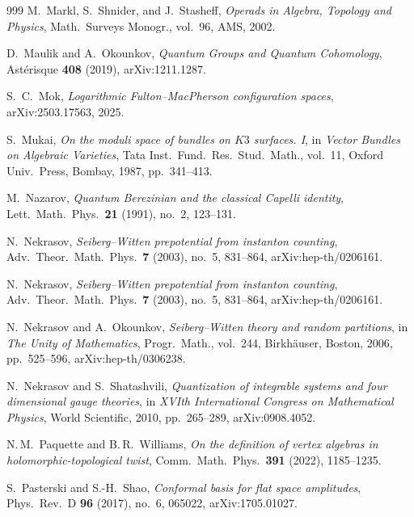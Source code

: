 \documentclass[11pt]{memoir}
\begin{document}
\begin{thebibliography}{999}
M.~Markl, S.~Shnider, and J.~Stasheff, \emph{Operads in Algebra, Topology and Physics}, Math.\ Surveys Monogr., vol.~96, AMS, 2002.

D.~Maulik and A.~Okounkov, \emph{Quantum Groups and Quantum Cohomology}, Ast\'erisque \textbf{408} (2019), arXiv:1211.1287.

S.~C.~Mok, \emph{Logarithmic Fulton--MacPherson configuration spaces}, arXiv:2503.17563, 2025.

S.~Mukai, \emph{On the moduli space of bundles on $K3$ surfaces. I}, in \emph{Vector Bundles on Algebraic Varieties}, Tata Inst.\ Fund.\ Res.\ Stud.\ Math., vol.~11, Oxford Univ.\ Press, Bombay, 1987, pp.~341--413.

M.~Nazarov, \emph{Quantum Berezinian and the classical Capelli identity}, Lett.\ Math.\ Phys.\ \textbf{21} (1991), no.~2, 123--131.

N.~Nekrasov, \emph{Seiberg--Witten prepotential from instanton counting}, Adv.\ Theor.\ Math.\ Phys.\ \textbf{7} (2003), no.~5, 831--864, arXiv:hep-th/0206161.

N.~Nekrasov, \emph{Seiberg--Witten prepotential from instanton counting}, Adv.\ Theor.\ Math.\ Phys.\ \textbf{7} (2003), no.~5, 831--864, arXiv:hep-th/0206161.

N.~Nekrasov and A.~Okounkov, \emph{Seiberg--Witten theory and random partitions}, in \emph{The Unity of Mathematics}, Progr.\ Math., vol.~244, Birkh\"auser, Boston, 2006, pp.~525--596, arXiv:hep-th/0306238.

N.~Nekrasov and S.~Shatashvili, \emph{Quantization of integrable systems and four dimensional gauge theories}, in \emph{XVIth International Congress on Mathematical Physics}, World Scientific, 2010, pp.~265--289, arXiv:0908.4052.

N.\,M.~Paquette and B.\,R.~Williams, \emph{On the definition of vertex algebras in holomorphic-topological twist}, Comm.\ Math.\ Phys.\ \textbf{391} (2022), 1185--1235.

S.~Pasterski and S.-H.~Shao, \emph{Conformal basis for flat space amplitudes}, Phys.\ Rev.\ D \textbf{96} (2017), no.~6, 065022, arXiv:1705.01027.


\end{thebibliography}
\end{document}
